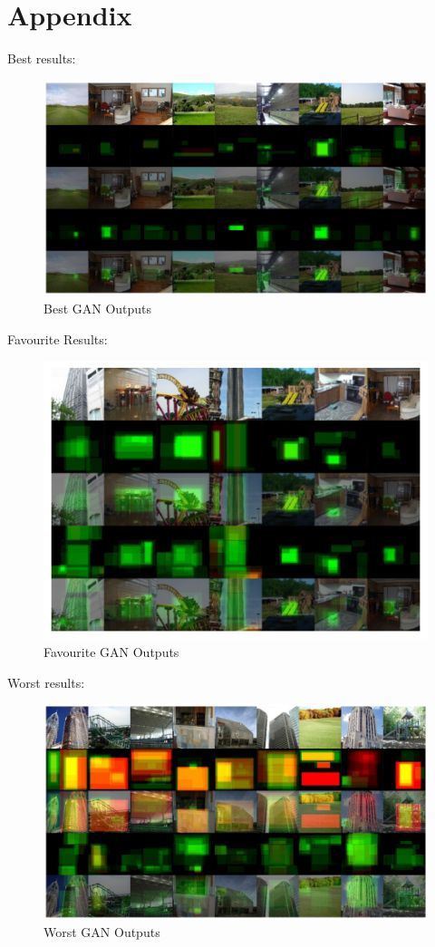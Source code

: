 \documentclass{UoYCSproject}
\begin{document}
\printbibliography

\chapter{Appendix}

Best results:
\begin{figure}[ht]
    \centering
    \includegraphics[width=\linewidth]{Best GAN Outputs}
    \caption{Best GAN Outputs}
    \label{fig:GANBestOutput}
\end{figure}

Favourite Results:
\begin{figure}[ht]
    \centering
    \includegraphics[]{Good GAN Outputs}
    \caption{Favourite GAN Outputs}
    \label{fig:GANGoodOutput}
\end{figure}

Worst results:
\begin{figure}[ht]
    \centering
    \includegraphics[width=\linewidth]{Worst GAN Outputs}
    \caption{Worst GAN Outputs}
    \label{fig:GANWorstOutput}
\end{figure}
\end{document}
